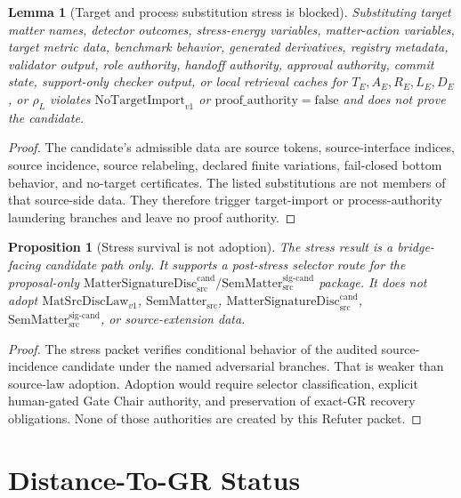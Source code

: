 \documentclass[11pt]{article}
\newcommand{\MatSrcDiscLaw}{\mathrm{MatSrcDiscLaw}_{v1}}
\newcommand{\SemMatterSrc}{\mathrm{SemMatter}_{\mathrm{src}}}
\newcommand{\SemMatterSig}{\mathrm{SemMatter}_{\mathrm{src}}^{\mathrm{sig\text{-}cand}}}
\newcommand{\MatSigDisc}{\mathrm{MatterSignatureDisc}_{\mathrm{src}}^{\mathrm{cand}}}
\newcommand{\NoTarget}{\mathrm{NoTargetImport}_{v1}}
\newcommand{\ProofAuthFalse}{\mathrm{proof\_authority=false}}
\newtheorem{lemma}{Lemma}
\newtheorem{proposition}{Proposition}
\begin{document}
\begin{lemma}[Target and process substitution stress is blocked]
Substituting target matter names, detector outcomes, stress-energy variables,
matter-action variables, target metric data, benchmark behavior, generated
derivatives, registry metadata, validator output, role authority, handoff
authority, approval authority, commit state, support-only checker output, or
local retrieval caches for \(T_E,A_E,R_E,L_E,D_E\), or \(\rho_L\) violates
\(\NoTarget\) or \(\ProofAuthFalse\) and does not prove the candidate.
\end{lemma}

\begin{proof}
The candidate's admissible data are source tokens, source-interface indices,
source incidence, source relabeling, declared finite variations, fail-closed
bottom behavior, and no-target certificates. The listed substitutions are not
members of that source-side data. They therefore trigger target-import or
process-authority laundering branches and leave no proof authority.
\end{proof}

\begin{proposition}[Stress survival is not adoption]
The stress result is a bridge-facing candidate path only. It supports a
post-stress selector route for the proposal-only
\(\MatSigDisc / \SemMatterSig\) package. It does not adopt
\(\MatSrcDiscLaw\), \(\SemMatterSrc\), \(\MatSigDisc\), \(\SemMatterSig\), or
source-extension data.
\end{proposition}

\begin{proof}
The stress packet verifies conditional behavior of the audited source-incidence
candidate under the named adversarial branches. That is weaker than source-law
adoption. Adoption would require selector classification, explicit
human-gated Gate Chair authority, and preservation of exact-GR recovery
obligations. None of those authorities are created by this Refuter packet.
\end{proof}

\section{Distance-To-GR Status}
\end{document}
